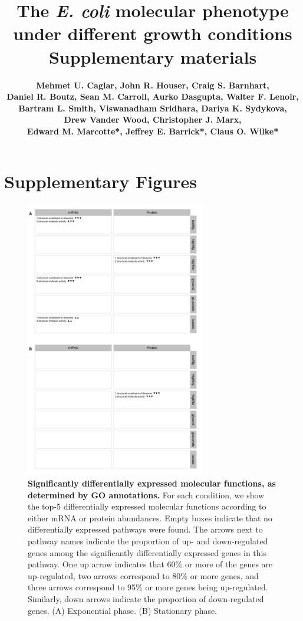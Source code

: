 \documentclass[a4paper]{article}
\title{\huge\bfseries \vspace{2cm} The \textit{E. coli} molecular phenotype under different growth conditions \\ \vspace{0.7cm}
	\Large\bfseries Supplementary materials \vspace{1.3cm}}
\author{
	\large\bfseries Mehmet U. Caglar, John R. Houser, Craig S. Barnhart, \\
	\large\bfseries Daniel R. Boutz, Sean M. Carroll, Aurko Dasgupta, Walter F. Lenoir,\\ 
	\large\bfseries Bartram L. Smith, Viswanadham Sridhara, Dariya K. Sydykova, \\
	\large\bfseries Drew Vander Wood, Christopher J. Marx, \\
	\large\bfseries Edward M. Marcotte*, Jeffrey E. Barrick*, Claus O. Wilke*}
\begin{document}
\maketitle
\newpage
	

\listoffigures


\newpage

\section*{Supplementary Figures}

\begin{figure}[!htb]
\centerline{	\includegraphics[width=0.7\textwidth]{../supplementary_figures/figS1_resultSummary_mf.png}
}
	\caption[Significantly differentially expressed molecular functions]
	{\textbf{Significantly differentially expressed molecular functions, as determined by GO annotations.} For each condition, we show the top-5 differentially expressed molecular functions according to either mRNA or protein abundances.  Empty boxes indicate that no differentially expressed pathways were found. The arrows next to pathway names indicate the proportion of up- and down-regulated genes among the significantly differentially expressed genes in this pathway. One up arrow indicates that 60\% or more of the genes are up-regulated, two arrows correspond to 80\% or more genes, and three arrows correspond to 95\% or more genes being up-regulated. Similarly, down arrows indicate the proportion of down-regulated genes. (A) Exponential phase. (B) Stationary phase.}
\end{figure}
\end{document}

